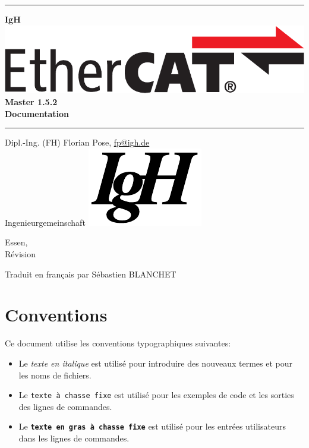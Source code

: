 \documentclass[a4paper,12pt,BCOR6mm,bibtotoc,idxtotoc]{scrbook}
\makeatletter
\renewcommand*{\lstlistoflistings}{%
  \begingroup
    \if@twocolumn
      \@restonecoltrue\onecolumn
    \else
      \@restonecolfalse
    \fi
    \lol@heading
    \setlength{\parskip}{\z@}%
    \setlength{\parindent}{\z@}%
    \setlength{\parfillskip}{\z@ \@plus 1fil}%
    \@starttoc{lol}%
    \if@restonecol\twocolumn\fi
  \endgroup
}
\newcommand{\IgH}{\raisebox{-0.7667ex}
  {\includegraphics[height=2.2ex]{images/ighsign}}}
\newcommand{\masterversion}{1.5.2}
\makeatother
\begin{document}
\pagestyle{empty}

\begin{titlepage}
  \begin{center}
    \rule{\textwidth}{1.5mm}

    {\Huge\sf\textbf{IgH \includegraphics[height=2.4ex]{images/ethercat}
      Master \masterversion}\\[1ex]
      \textbf{Documentation}}

    \vspace{1ex}
    \rule{\textwidth}{1.5mm}

    \vspace{\fill} {\Large Dipl.-Ing. (FH) Florian Pose,
    \url{fp@igh.de}\\[1ex] Ingenieurgemeinschaft \IgH}

    \vspace{\fill}
    {\Large Essen, \rcsInfoLongDate\\[1ex]
      R\'evision \rcsInfoRevision}

    \vspace{\fill} {\Large Traduit en fran\c{c}ais par S\'ebastien BLANCHET }


  \end{center}
\end{titlepage}


\pagestyle{scrplain}

\tableofcontents
\listoftables
\listoffigures


\newpage
\pagestyle{scrheadings}

\section*{Conventions}

Ce document utilise les conventions typographiques suivantes:

\begin{itemize}

\item Le \textit{texte en italique} est utilis\'e pour introduire des nouveaux termes et pour les noms de fichiers.

\item Le \texttt{texte \`a chasse fixe} est utilis\'e pour les exemples de code et les sorties des lignes de commandes.

\item Le \texttt{\textbf{texte en gras \`a chasse fixe}} est utilis\'e pour les entr\'ees utilisateurs dans les lignes de commandes.

\end{itemize}
\end{document}
